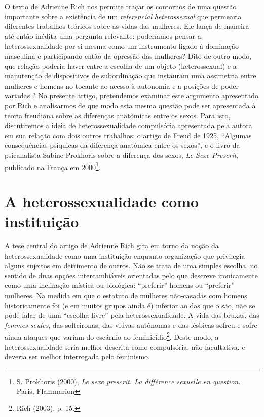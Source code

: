 O texto de Adrienne Rich nos permite traçar os contornos de uma questão
importante sobre a existência de um \emph{referencial}
\emph{heterossexual} que permearia diferentes trabalhos teóricos sobre
as vidas das mulheres. Ele lança de maneira até então inédita uma
pergunta relevante: poderíamos pensar a heterossexualidade por si mesma
como um instrumento ligado à dominação masculina e participando então da
opressão das mulheres? Dito de outro modo, que relação poderia haver
entre a escolha de um objeto (heterossexual) e a manutenção de
dispositivos de subordinação que instauram uma assimetria entre mulheres
e homens no tocante ao acesso à autonomia e a posições de poder variadas
? No presente artigo, pretendemos examinar este argumento apresentado
por Rich e analisarmos de que modo esta mesma questão pode ser
apresentada à teoria freudiana sobre as diferenças anatômicas entre os
sexos. Para isto, discutiremos a ideia de heterossexualidade compulsória
apresentada pela autora em sua relação com dois outros trabalhos: o
artigo de Freud de 1925, ``Algumas consequências psíquicas da diferença
anatômica entre os sexos'', e o livro da psicanalista Sabine Prokhoris
sobre a diferença dos sexos, \emph{Le Sexe Prescrit,} publicado na
França em 2000\footnote{S. Prokhoris (2000), \emph{Le sexe prescrit. La
  différence sexuelle en question}. Paris, Flammarion}.

\section{A heterossexualidade como instituição}

A tese central do artigo de Adrienne Rich gira em torno da noção da
heterossexualidade como uma instituição enquanto organização que
privilegia alguns sujeitos em detrimento de outros. Não se trata de uma
simples escolha, no sentido de duas opções intercambiáveis orientadas
pelo que descreve ironicamente como uma inclinação mística ou biológica:
``preferir'' homens ou ``preferir'' mulheres. Na medida em que o
estatuto de mulheres não-casadas com homens historicamente foi (e em
muitos grupos ainda é) inferior ao das que o são, não se pode falar de
uma ``escolha livre'' pela heterossexualidade. A vida das bruxas, das
\emph{femmes seules}, das solteironas, das viúvas autônomas e das
lésbicas sofreu e sofre ainda ataques que variam do escárnio ao
feminicídio\footnote{Rich (2003), p. 15.}. Deste modo, a
heterossexualidade seria melhor descrita como compulsória, não
facultativa, e deveria ser melhor interrogada pelo feminismo.

